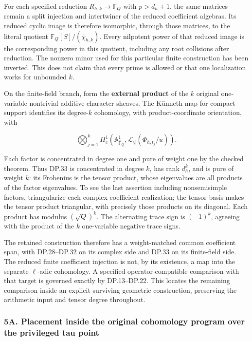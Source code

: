 For each specified reduction \(R_{h,k}\to\mathbb F_Q\) with \(p>d_h+1\), the same matrices remain a split injection and intertwiner of the reduced coefficient algebras. Its reduced cyclic image is therefore isomorphic, through those matrices, to the literal quotient \(\mathbb F_Q[S]/(\overline\chi_{h,k})\). Every nilpotent power of that reduced image is the corresponding power in this quotient, including any root collisions after reduction. The nonzero minor used for this particular finite construction has been inverted. This does not claim that every prime is allowed or that one localization works for unbounded \(k\).

On the finite-field branch, form the \textbf{external product} of the \(k\) original one-variable nontrivial additive-character sheaves. The Künneth map for compact support identifies its degree-\(k\) cohomology, with product-coordinate orientation, with

\[
\bigotimes_{j=1}^k
H_c^1(\mathbb A^1_{\overline{\mathbb F}_Q},
 \mathcal L_{\psi}(\Phi_{h,t_j}/u)).
\tag{DP.33}
\]

Each factor is concentrated in degree one and pure of weight one by the checked theorem. Thus DP.33 is concentrated in degree \(k\), has rank \(d_h^k\), and is pure of weight \(k\): its Frobenius is the tensor product, whose eigenvalues are all products of the factor eigenvalues. To see the last assertion including nonsemisimple factors, triangularize each complex coefficient realization; the tensor basis makes the tensor product triangular, with precisely those products on its diagonal. Each product has modulus \((\sqrt Q)^k\). The alternating trace sign is \((-1)^k\), agreeing with the product of the \(k\) one-variable negative trace signs.

The retained construction therefore has a weight-matched common coefficient span, with DP.28--DP.32 on its complex side and DP.33 on its finite-field side. The reduced finite coefficient injection is not, by its existence, a map into the separate \(\ell\)-adic cohomology. A specified operator-compatible comparison with that target is governed exactly by DP.13--DP.22. This locates the remaining comparison inside an explicit surviving geometric construction, preserving the arithmetic input and tensor degree throughout.

\subsubsection{5A. Placement inside the original cohomology program over the privileged tau point}\label{endpoint-purity_review--a.-placement-inside-the-original-cohomology-program-over-the-privileged-tau-point}


